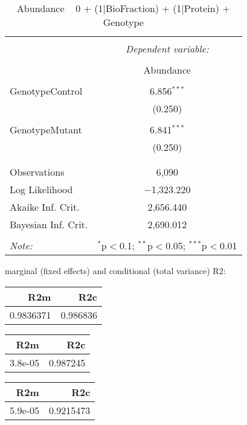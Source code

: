 \documentclass[11pt]{report}
\begin{document}
\begin{table}[!htbp] \centering 
  \caption{Abundance ~ 0 + (1|BioFraction) + (1|Protein) + Genotype} 
  \label{} 
\begin{tabular}{@{\extracolsep{5pt}}lc} 
\\[-1.8ex]\hline 
\hline \\[-1.8ex] 
 & \multicolumn{1}{c}{\textit{Dependent variable:}} \\ 
\cline{2-2} 
\\[-1.8ex] & Abundance \\ 
\hline \\[-1.8ex] 
 GenotypeControl & 6.856$^{***}$ \\ 
  & (0.250) \\ 
  & \\ 
 GenotypeMutant & 6.841$^{***}$ \\ 
  & (0.250) \\ 
  & \\ 
\hline \\[-1.8ex] 
Observations & 6,090 \\ 
Log Likelihood & $-$1,323.220 \\ 
Akaike Inf. Crit. & 2,656.440 \\ 
Bayesian Inf. Crit. & 2,690.012 \\ 
\hline 
\hline \\[-1.8ex] 
\textit{Note:}  & \multicolumn{1}{r}{$^{*}$p$<$0.1; $^{**}$p$<$0.05; $^{***}$p$<$0.01} \\ 
\end{tabular} 
\end{table} 
marginal (fixed effects) and conditional (total variance) R2:

\begin{tabular}{r|r}
\hline
R2m & R2c\\
\hline
0.9836371 & 0.986836\\
\hline
\end{tabular}

\begin{tabular}{r|r}
\hline
R2m & R2c\\
\hline
3.8e-05 & 0.987245\\
\hline
\end{tabular}

\begin{tabular}{r|r}
\hline
R2m & R2c\\
\hline
5.9e-05 & 0.9215473\\
\hline
\end{tabular}
\end{document}
